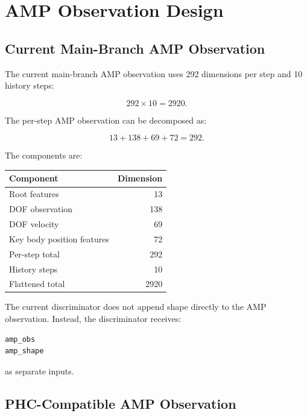 \documentclass[11pt,a4paper]{article}
\begin{document}
\section{AMP Observation Design}

\subsection{Current Main-Branch AMP Observation}

The current main-branch AMP observation uses 292 dimensions per step and 10 history steps:

\begin{equation}
    292 \times 10 = 2920.
\end{equation}

The per-step AMP observation can be decomposed as:

\begin{equation}
    13 + 138 + 69 + 72 = 292.
\end{equation}

The components are:

\begin{center}
    \begin{tabular}{lr}
        \toprule
        Component                  & Dimension \\
        \midrule
        Root features              & 13        \\
        DOF observation            & 138       \\
        DOF velocity               & 69        \\
        Key body position features & 72        \\
        \midrule
        Per-step total             & 292       \\
        History steps              & 10        \\
        Flattened total            & 2920      \\
        \bottomrule
    \end{tabular}
\end{center}

The current discriminator does not append shape directly to the AMP observation. Instead, the discriminator receives:

\begin{lstlisting}
amp_obs
amp_shape
\end{lstlisting}

as separate inputs.

\subsection{PHC-Compatible AMP Observation}
\end{document}
